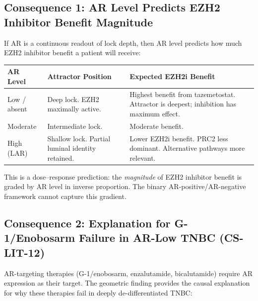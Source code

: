 \documentclass[12pt, a4paper]{article}
\begin{document}
\subsection{Consequence 1: AR Level Predicts
EZH2 Inhibitor Benefit Magnitude}

If AR is a continuous readout of lock depth,
then AR level predicts how much EZH2 inhibitor
benefit a patient will receive:

\begin{center}
\begin{tabular}{p{4cm}p{4cm}p{4.5cm}}
\toprule
\textbf{AR Level} &
\textbf{Attractor Position} &
\textbf{Expected EZH2i Benefit} \\
\midrule
Low / absent &
Deep lock. EZH2 maximally active. &
Highest benefit from tazemetostat.
Attractor is deepest; inhibition
has maximum effect. \\[0.5em]
Moderate &
Intermediate lock. &
Moderate benefit. \\[0.5em]
High (LAR) &
Shallow lock. Partial luminal
identity retained. &
Lower EZH2i benefit. PRC2 less
dominant. Alternative pathways
more relevant. \\
\bottomrule
\end{tabular}
\end{center}

\vspace{0.5em}

This is a dose--response prediction: the
\textit{magnitude} of EZH2 inhibitor benefit
is graded by AR level in inverse proportion.
The binary AR-positive/AR-negative framework
cannot capture this gradient.

\subsection{Consequence 2: Explanation for
G-1/Enobosarm Failure in AR-Low TNBC
(CS-LIT-12)}

AR-targeting therapies (G-1/enobosarm,
enzalutamide, bicalutamide) require AR
expression as their target. The geometric
finding provides the causal explanation for
why these therapies fail in deeply
de-differentiated TNBC:
\end{document}
